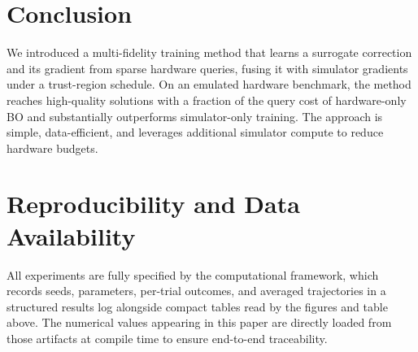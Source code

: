 \section{Conclusion}
We introduced a multi-fidelity training method that learns a surrogate correction and its gradient from sparse hardware queries, fusing it with simulator gradients under a trust-region schedule. On an emulated hardware benchmark, the method reaches high-quality solutions with a fraction of the query cost of hardware-only BO and substantially outperforms simulator-only training. The approach is simple, data-efficient, and leverages additional simulator compute to reduce hardware budgets.

\section*{Reproducibility and Data Availability}
All experiments are fully specified by the computational framework, which records seeds, parameters, per-trial outcomes, and averaged trajectories in a structured results log alongside compact tables read by the figures and table above. The numerical values appearing in this paper are directly loaded from those artifacts at compile time to ensure end-to-end traceability.





